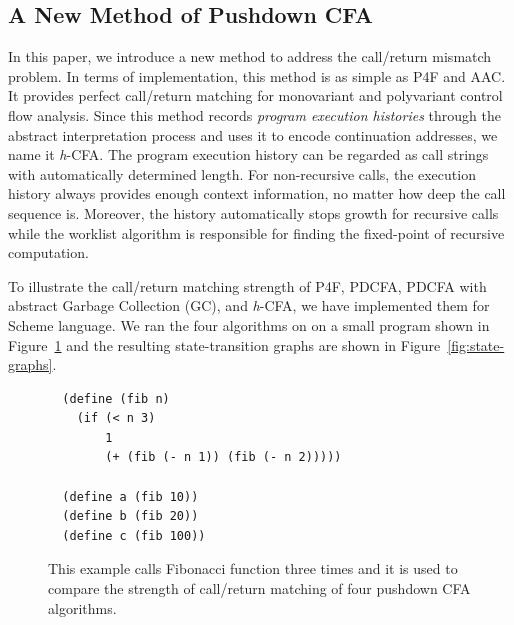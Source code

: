 \documentclass{article}
\begin{document}
\subsection{A New Method of Pushdown CFA}
\label{sub:A New Method of Pushdown CFA}

In this paper, we introduce a new method to address the call/return mismatch problem.
In terms of implementation, this method is as simple as P4F and AAC\@.
It provides perfect call/return matching for monovariant and polyvariant control flow analysis.
Since this method records \emph{program execution histories} through the abstract interpretation process and uses it to encode continuation addresses, we name it \textit{h}-CFA\@.
The program execution history can be regarded as call strings with automatically determined length.
For non-recursive calls, the execution history always provides enough context information, no matter how deep the call sequence is.
Moreover, the history automatically stops growth for recursive calls while the worklist algorithm is responsible
for finding the fixed-point of recursive computation.

To illustrate the call/return matching strength of P4F, PDCFA, PDCFA with abstract Garbage Collection (GC), and \textit{h}-CFA, we have
implemented them for Scheme language. We ran the four algorithms on on a small program shown in Figure~\ref{fig:fib} and
the resulting state-transition graphs are shown in Figure~\ref{fig:state-graphs}.

\begin{figure}
  \small
  \begin{lstlisting}
  (define (fib n)
    (if (< n 3)
        1
        (+ (fib (- n 1)) (fib (- n 2)))))

  (define a (fib 10))
  (define b (fib 20))
  (define c (fib 100))
  \end{lstlisting}
\caption{
This example calls Fibonacci function three times
and it is used to compare the strength of call/return matching of four pushdown CFA algorithms.
}
\label{fig:fib}
\end{figure}
\end{document}
